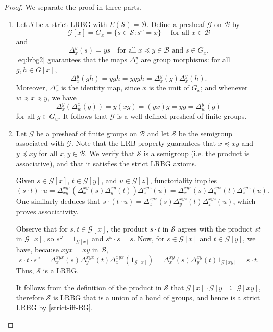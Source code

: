 \documentclass[11pt, oneside, reqno]{amsart}
\theoremstyle{definition}
\numberwithin{equation}{section}
\def \BB{{\mathcal{B}}}
\def \GG{{\mathcal{G}}}
\def \SS{{\mathcal{S}}}
\begin{document}
\begin{proof}
    We separate the proof in three parts.
    \begin{enumerate}[wide]
        \item
    Let $\SS$ be a strict LRBG with $E(\SS) = \BB$. Define a presheaf $\GG$ on $\BB$ by
    \[
        \GG[x] = G_x = \{ s \in \SS : s^\omega = x \} \quad\text{ for all } x \in \BB
    \]
    and
    \[
        \Delta_x^y(s) = ys \quad\text{for all } x \preceq y \in \BB \text{ and } s \in G_x.
    \]
    \cref{eq:lrbg2} guarantees that the maps $\Delta_x^y$ are group morphisms: for all $g,h \in G[x]$,
    \[
        \Delta_x^y(gh) = ygh = ygyh = \Delta_x^y(g)\Delta_x^y(h).
    \]
    Moreover, $\Delta_x^x$ is the identity map, since $x$ is the unit of $G_x$; and whenever $w \preceq x \preceq y$, we have
    \[
        \Delta_x^y ( \Delta_w^x (g) ) = y (x g) = (yx) g = yg = \Delta^y_w(g)
    \]
    for all $g \in G_w$. It follows that $\GG$ is a well-defined presheaf of finite groups.

    \item
    Let $\GG$ be a presheaf of finite groups on $\BB$
    and let $\SS$ be the semigroup associated with $\GG$.
    Note that the LRB property guarantees that $x \preceq xy$ and $y \preceq xy$ for all $x,y \in \BB$.
    We verify that $\SS$ is a semigroup (i.e. the product is associative), and that it satisfies the strict LRBG axioms.

    Given $s \in \GG[x]$, $t \in \GG[y]$, and $u \in \GG[z]$, functoriality implies
    \[
        (s \cdot t) \cdot u
        = \Delta_{xy}^{xyz}( \Delta_x^{xy}(s) \Delta_y^{xy}(t) ) \Delta_z^{xyz}(u)
        = \Delta_x^{xyz}(s) \Delta_y^{xyz}(t) \Delta_z^{xyz}(u).
    \]
    One similarly deduces that $s \cdot (t  \cdot u) = \Delta_x^{xyz}(s) \Delta_y^{xyz}(t) \Delta_z^{xyz}(u)$,
    which proves associativity.

    Observe that for $s, t \in \GG[x]$, the product $s \cdot t$ in $\SS$ agrees with
    the product $st$ in $\GG[x]$, so $s^\omega = 1_{\GG[x]}$ and
    $s^\omega \cdot s = s$.
    Now, for $s \in \GG[x]$ and $t \in \GG[y]$, we have, because $xyx = xy$ in $\BB$,
    \[
        s \cdot t \cdot s^\omega
        = \Delta_x^{xyx}(s) \Delta_y^{xyx}(t) \Delta_x^{xyx}(1_{\GG[x]})
        = \Delta_x^{xy}(s) \Delta_y^{xy}(t) 1_{\GG[xy]}
        = s \cdot t.
    \]
    Thus, $\SS$ is a LRBG.

    It follows from the definition of the product in $\SS$ that $\GG[x] \cdot
    \GG[y] \subseteq \GG[xy]$, therefore $\SS$ is LRBG that is a union
    of a band of groups, and hence is a strict LRBG by \cref{strict-iff-BG}.


\end{enumerate}
\end{proof}
\end{document}
